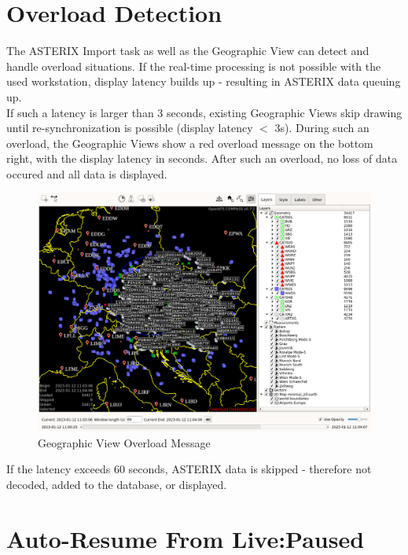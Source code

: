 \section{Overload Detection}

The ASTERIX Import task as well as the Geographic View can detect and handle overload situations. If the real-time processing is not possible with the used workstation, display latency builds up - resulting in ASTERIX data queuing up. \\

If such a latency is larger than 3 seconds,  existing Geographic Views skip drawing until re-synchronization is possible (display latency $<$ 3s). During such an overload, the Geographic Views show a red overload message on the bottom right, with the display latency in seconds. After such an overload, no loss of data occured and all data is displayed. \\

\begin{figure}[H]
    \hspace*{-2.5cm}
    \includegraphics[width=19cm,frame]{figures/geoview_overload.png}
  \caption{Geographic View Overload Message}
\end{figure} 

If the latency exceeds 60 seconds, ASTERIX data is skipped - therefore not decoded, added to the database, or displayed.

\section{Auto-Resume From Live:Paused}

